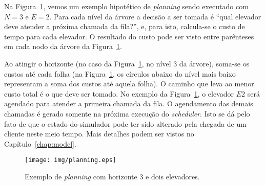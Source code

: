 Na Figura~\ref{fig:planning}, vemos um exemplo hipotético de \textit{planning}
sendo executado com $N = 3$ e $E = 2$. Para cada nível da árvore a decisão a ser
tomada é ``qual elevador deve atender a próxima chamada da fila?'', e, para
isto, calcula-se o custo de tempo para cada elevador. O resultado do custo
pode ser visto entre parênteses em cada nodo da árvore da
Figura~\ref{fig:planning}.

Ao atingir o horizonte (no caso da Figura~\ref{fig:planning}, no nível 3 da
árvore), soma-se os custos até cada folha (na Figura~\ref{fig:planning}, os
círculos abaixo do nível mais baixo representam a soma dos custos até aquela
folha). O caminho que leva ao menor custo total é o que deve ser tomado. No
exemplo da Figura~\ref{fig:planning}, o elevador $E2$ será agendado para atender
a primeira chamada da fila. O agendamento das demais chamadas é gerado somente
na próxima execução do \textit{scheduler}. Isto se dá pelo fato de que o estado
do simulador pode ter sido alterado pela chegada de um cliente neste meio tempo.
Mais detalhes podem ser vistos no Capítulo~\ref{chap:model}.

\begin{figure}[htb!]
  \centering
  \texttt{[image: img/planning.eps]}
  \caption{Exemplo de \textit{planning} com horizonte 3 e dois elevadores.}
\label{fig:planning}
\end{figure}